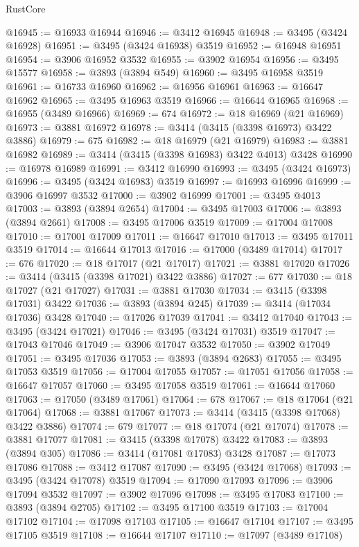 \begin{lexlean}{RustCore}
\begin{coremodule}
@16945 := @16933 @16944
@16946 := @3412 @16945
@16948 := @3495 (@3424 @16928)
@16951 := @3495 (@3424 @16938) @3519
@16952 := @16948 @16951
@16954 := @3906 @16952 @3532
@16955 := @3902 @16954
@16956 := @3495 @15577
@16958 := @3893 (@3894 @549)
@16960 := @3495 @16958 @3519
@16961 := @16733 @16960
@16962 := @16956 @16961
@16963 := @16647 @16962
@16965 := @3495 @16963 @3519
@16966 := @16644 @16965
@16968 := @16955 (@3489 @16966)
@16969 := 674
@16972 := @18 @16969 (@21 @16969)
@16973 := @3881 @16972
@16978 := @3414 (@3415 (@3398 @16973) @3422 @3886)
@16979 := 675
@16982 := @18 @16979 (@21 @16979)
@16983 := @3881 @16982
@16989 := @3414 (@3415 (@3398 @16983) @3422 @4013) @3428
@16990 := @16978 @16989
@16991 := @3412 @16990
@16993 := @3495 (@3424 @16973)
@16996 := @3495 (@3424 @16983) @3519
@16997 := @16993 @16996
@16999 := @3906 @16997 @3532
@17000 := @3902 @16999
@17001 := @3495 @4013
@17003 := @3893 (@3894 @2654)
@17004 := @3495 @17003
@17006 := @3893 (@3894 @2661)
@17008 := @3495 @17006 @3519
@17009 := @17004 @17008
@17010 := @17001 @17009
@17011 := @16647 @17010
@17013 := @3495 @17011 @3519
@17014 := @16644 @17013
@17016 := @17000 (@3489 @17014)
@17017 := 676
@17020 := @18 @17017 (@21 @17017)
@17021 := @3881 @17020
@17026 := @3414 (@3415 (@3398 @17021) @3422 @3886)
@17027 := 677
@17030 := @18 @17027 (@21 @17027)
@17031 := @3881 @17030
@17034 := @3415 (@3398 @17031) @3422
@17036 := @3893 (@3894 @245)
@17039 := @3414 (@17034 @17036) @3428
@17040 := @17026 @17039
@17041 := @3412 @17040
@17043 := @3495 (@3424 @17021)
@17046 := @3495 (@3424 @17031) @3519
@17047 := @17043 @17046
@17049 := @3906 @17047 @3532
@17050 := @3902 @17049
@17051 := @3495 @17036
@17053 := @3893 (@3894 @2683)
@17055 := @3495 @17053 @3519
@17056 := @17004 @17055
@17057 := @17051 @17056
@17058 := @16647 @17057
@17060 := @3495 @17058 @3519
@17061 := @16644 @17060
@17063 := @17050 (@3489 @17061)
@17064 := 678
@17067 := @18 @17064 (@21 @17064)
@17068 := @3881 @17067
@17073 := @3414 (@3415 (@3398 @17068) @3422 @3886)
@17074 := 679
@17077 := @18 @17074 (@21 @17074)
@17078 := @3881 @17077
@17081 := @3415 (@3398 @17078) @3422
@17083 := @3893 (@3894 @305)
@17086 := @3414 (@17081 @17083) @3428
@17087 := @17073 @17086
@17088 := @3412 @17087
@17090 := @3495 (@3424 @17068)
@17093 := @3495 (@3424 @17078) @3519
@17094 := @17090 @17093
@17096 := @3906 @17094 @3532
@17097 := @3902 @17096
@17098 := @3495 @17083
@17100 := @3893 (@3894 @2705)
@17102 := @3495 @17100 @3519
@17103 := @17004 @17102
@17104 := @17098 @17103
@17105 := @16647 @17104
@17107 := @3495 @17105 @3519
@17108 := @16644 @17107
@17110 := @17097 (@3489 @17108)

\end{coremodule}
\end{lexlean}
